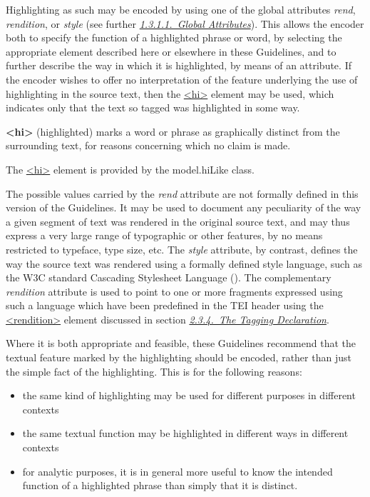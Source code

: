 Highlighting as such may be encoded by using one of the global attributes {\itshape rend}, {\itshape rendition}, or {\itshape style} (see further \textit{\hyperref[STGA]{1.3.1.1.\ Global Attributes}}). This allows the encoder both to specify the function of a highlighted phrase or word, by selecting the appropriate element described here or elsewhere in these Guidelines, and to further describe the way in which it is highlighted, by means of an attribute. If the encoder wishes to offer no interpretation of the feature underlying the use of highlighting in the source text, then the \hyperref[TEI.hi]{<hi>} element may be used, which indicates only that the text so tagged was highlighted in some way. 
\begin{sansreflist}
  
\item [\textbf{<hi>}] (highlighted) marks a word or phrase as graphically distinct from the surrounding text, for reasons concerning which no claim is made.
\end{sansreflist}
 The \hyperref[TEI.hi]{<hi>} element is provided by the \textsf{model.hiLike} class.\par
The possible values carried by the {\itshape rend} attribute are not formally defined in this version of the Guidelines. It may be used to document any peculiarity of the way a given segment of text was rendered in the original source text, and may thus express a very large range of typographic or other features, by no means restricted to typeface, type size, etc. The {\itshape style} attribute, by contrast, defines the way the source text was rendered using a formally defined style language, such as the W3C standard Cascading Stylesheet Language (\cite{CSS1}). The complementary {\itshape rendition} attribute is used to point to one or more fragments expressed using such a language which have been predefined in the TEI header using the \hyperref[TEI.rendition]{<rendition>} element discussed in section \textit{\hyperref[HD57]{2.3.4.\ The Tagging Declaration}}.\par
Where it is both appropriate and feasible, these Guidelines recommend that the textual feature marked by the highlighting should be encoded, rather than just the simple fact of the highlighting. This is for the following reasons: \begin{itemize}
\item the same kind of highlighting may be used for different purposes in different contexts
\item the same textual function may be highlighted in different ways in different contexts
\item for analytic purposes, it is in general more useful to know the intended function of a highlighted phrase than simply that it is distinct.
\end{itemize} \par
